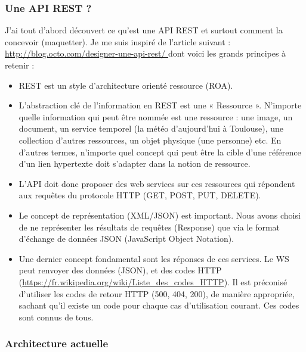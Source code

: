 \subsubsection{Une API REST ?}

J'ai tout d'abord découvert ce qu'est une API REST et surtout comment la concevoir (maquetter). Je me suis inspiré de l'article suivant :\\
\url{http://blog.octo.com/designer-une-api-rest/ } dont voici les grands principes à retenir :

\begin{itemize}
\item REST est un style d'architecture orienté ressource (ROA).
\item L'abstraction clé de l'information en REST est une « Ressource ». N'importe quelle information qui peut être nommée est une ressource : une image, un document, un service temporel (la météo d'aujourd'hui à Toulouse), une collection d'autres ressources, un objet physique (une personne) etc. En d'autres termes, n'importe quel concept qui peut être la cible d'une référence d'un lien hypertexte doit s'adapter dans la notion de ressource.
\item L'API doit donc proposer des web services sur ces ressources qui répondent aux requêtes du protocole HTTP (GET, POST, PUT, DELETE).
\item Le concept de représentation (XML/JSON) est important. Nous avons choisi de ne représenter les résultats de requêtes (Response) que via le format d'échange de données JSON (JavaScript Object Notation).
\item Une dernier concept fondamental sont les réponses de ces services. Le WS peut renvoyer des données (JSON), et des codes HTTP (\url{https://fr.wikipedia.org/wiki/Liste_des_codes_HTTP}). Il est préconisé d'utiliser les codes de retour HTTP (500, 404, 200), de manière appropriée, sachant qu'il existe un code pour chaque cas d'utilisation courant. Ces codes sont connus de tous. 
\end{itemize}

\subsubsection{Architecture actuelle}

